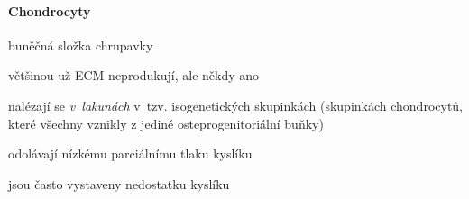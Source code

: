 \documentclass[DIV=8]{scrreprt}
\begin{document}
\paragraph{Chondrocyty}
\begin{myItemize}[nosep]
    \item buněčná složka chrupavky
    \item většinou už ECM neprodukují, ale někdy ano
    \item nalézají se \emph{v lakunách} v tzv. isogenetických skupinkách (skupinkách chondrocytů, které všechny vznikly z jediné osteprogenitoriální buňky)
    \item odolávají nízkému parciálnímu tlaku kyslíku
\begin{myItemize}[nosep]
    \item jsou často vystaveny nedostatku kyslíku
\end{myItemize}

\end{myItemize}



\end{document}
